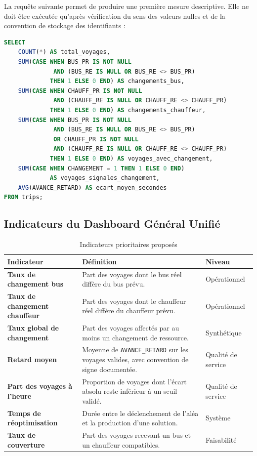 \documentclass[12pt,a4paper]{article}
\newcommand{\code}[1]{\texttt{#1}}
\begin{document}
La requête suivante permet de produire une première mesure descriptive. Elle ne doit être exécutée qu’après vérification du sens des valeurs nulles et de la convention de stockage des identifiants :

\begin{lstlisting}[language=SQL]
SELECT
    COUNT(*) AS total_voyages,
    SUM(CASE WHEN BUS_PR IS NOT NULL
              AND (BUS_RE IS NULL OR BUS_RE <> BUS_PR)
             THEN 1 ELSE 0 END) AS changements_bus,
    SUM(CASE WHEN CHAUFF_PR IS NOT NULL
              AND (CHAUFF_RE IS NULL OR CHAUFF_RE <> CHAUFF_PR)
             THEN 1 ELSE 0 END) AS changements_chauffeur,
    SUM(CASE WHEN BUS_PR IS NOT NULL
              AND (BUS_RE IS NULL OR BUS_RE <> BUS_PR)
              OR CHAUFF_PR IS NOT NULL
              AND (CHAUFF_RE IS NULL OR CHAUFF_RE <> CHAUFF_PR)
             THEN 1 ELSE 0 END) AS voyages_avec_changement,
    SUM(CASE WHEN CHANGEMENT = 1 THEN 1 ELSE 0 END)
             AS voyages_signales_changement,
    AVG(AVANCE_RETARD) AS ecart_moyen_secondes
FROM trips;
\end{lstlisting}


\subsection{Indicateurs du Dashboard Général Unifié}

\begin{table}[ht]
\centering
\caption{Indicateurs prioritaires proposés}
\begin{tabularx}{\textwidth}{>{\bfseries}p{4cm} X p{3cm}}
\toprule
Indicateur & Définition & Niveau \\
\midrule
Taux de changement bus & Part des voyages dont le bus réel diffère du bus prévu. & Opérationnel \\
Taux de changement chauffeur & Part des voyages dont le chauffeur réel diffère du chauffeur prévu. & Opérationnel \\
Taux global de changement & Part des voyages affectés par au moins un changement de ressource. & Synthétique \\
Retard moyen & Moyenne de \code{AVANCE\_RETARD} sur les voyages valides, avec convention de signe documentée. & Qualité de service \\
Part des voyages à l’heure & Proportion de voyages dont l’écart absolu reste inférieur à un seuil validé. & Qualité de service \\
Temps de réoptimisation & Durée entre le déclenchement de l’aléa et la production d’une solution. & Système \\
Taux de couverture & Part des voyages recevant un bus et un chauffeur compatibles. & Faisabilité \\
\bottomrule
\end{tabularx}
\end{table}
\end{document}
